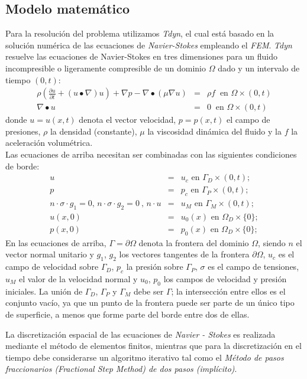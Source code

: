 \documentclass[10pt,a4paper,final]{article}
\begin{document}
\subsection{Modelo matemático}
Para la resolución del problema utilizamos \emph{Tdyn}, el cual está basado en la solución numérica de las ecuaciones de \emph{Navier-Stokes} empleando el \emph{FEM}.
\emph{Tdyn} resuelve las ecuaciones de Navier-Stokes en tres dimensiones para un fluido incompresible o ligeramente compresible de un dominio $\Omega$ dado y un intervalo de tiempo $(0,t):$
\begin{eqnarray}
\rho \left(\frac{\partial u}{\partial t}+\left( u \bullet  \nabla \right)u \right)+ \nabla p - \nabla \bullet(\mu \nabla u) &=& \rho f~ \mbox{ en  }\Omega \times (0,t)\\
\nabla \bullet u&=&0 ~ \mbox{ en  } \Omega \times (0,t)
\end{eqnarray}
donde $u = u(x,t)$ denota el vector velocidad, $p=p(x,t)$ el campo de presiones, $\rho$ la densidad (constante), $\mu$ la viscosidad dinámica del fluido y la $f$ la aceleración volumétrica.\\
Las ecuaciones de arriba necesitan ser combinadas con las siguientes condiciones de borde:
\begin{eqnarray}
u &=& u_c \mbox{ en  } \Gamma_D \times (0,t);\\
p &=& p_c \mbox{ en  } \Gamma_P \times (0,t);\\
n \cdot \sigma \cdot g_1=0 \mbox{, } n \cdot \sigma \cdot g_2=0~ \mbox{, } n \cdot u&=&u_M \mbox{ en  } \Gamma_M \times (0,t);\\
u(x,0)&=&u_0(x) \mbox{ en  } \Omega_D \times \lbrace 0 \rbrace ;\\
p(x,0)&=&p_0(x) \mbox{ en  } \Omega_D \times \lbrace 0 \rbrace ;
\end{eqnarray}
En las ecuaciones de arriba, $\Gamma = \partial \Omega$ denota la frontera del dominio $\Omega$, siendo $n$ el vector normal unitario y $g_1$, $g_2$ los vectores tangentes de la frontera $\partial \Omega$, $u_c$ es el campo de velocidad sobre $\Gamma_D$, $p_c$ la presión sobre $\Gamma_P$, $\sigma$ es el campo de tensiones, $u_M$ el valor de la velocidad normal y $u_0$, $p_0$ los campos de velocidad y presión iniciales. La unión de $\Gamma_D$, $\Gamma_P$ y $\Gamma_M$ debe ser $\Gamma$; la intersección entre ellos es el conjunto vacío, ya que un punto de la frontera puede ser parte de un único tipo de superficie, a menos que forme parte del borde entre dos de ellas.

La discretización espacial de las ecuaciones de \emph{Navier - Stokes} es realizada mediante el método de elementos finitos, mientras que para la discretización en el tiempo debe considerarse un algoritmo iterativo tal como el \emph{Método de pasos fraccionarios (Fractional Step Method) de dos pasos (implícito)}.
\end{document}
